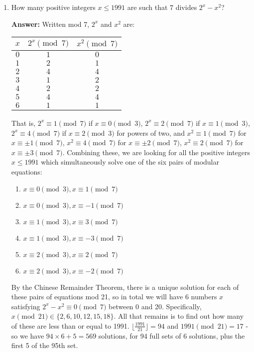 \documentclass{article}
\begin{document}
\begin{enumerate}
    \item How many positive integers $x \leq 1991$ are such that $7$ divides $2^x - x^2$?
    
    \textbf{Answer:} Written mod 7, $2^x$ and $x^2$ are:
    \begin{center}
    \begin{tabular}{ |c|c|c| } 
    \hline
    $x$ & $2^x \pmod{7}$ & $x^2 \pmod{7}$ \\
    \hline
    $0$ & $1$ & $0$ \\
    $1$ & $2$ & $1$ \\
    $2$ & $4$ & $4$ \\
    $3$ & $1$ & $2$ \\
    $4$ & $2$ & $2$ \\
    $5$ & $4$ & $4$ \\
    $6$ & $1$ & $1$ \\
    \hline
    \end{tabular}
    \end{center}

    That is, $2^x \equiv 1 \pmod{7}$ if $x \equiv 0 \pmod{3}$, $2^x \equiv 2 \pmod{7}$ if $x \equiv 1 \pmod{3}$, $2^x \equiv 4 \pmod{7}$ if $x \equiv 2 \pmod{3}$ for powers of two, and $x^2 \equiv 1 \pmod{7}$ for $x \equiv \pm1 \pmod{7}$, $x^2 \equiv 4 \pmod{7}$ for $x \equiv \pm 2 \pmod{7}$, $x^2 \equiv 2 \pmod{7}$ for $x \equiv \pm 3 \pmod{7}$. Combining these, we are looking for all the positive integers $x \leq 1991$ which simultaneously solve one of the six pairs of modular equations:
    \begin{enumerate}
        \item $x \equiv 0 \pmod{3}, x \equiv 1 \pmod{7}$
        \item $x \equiv 0 \pmod{3}, x \equiv -1 \pmod{7}$
        \item $x \equiv 1 \pmod{3}, x \equiv  3 \pmod{7}$
        \item $x \equiv 1 \pmod{3}, x \equiv -3 \pmod{7}$
        \item $x \equiv 2 \pmod{3}, x \equiv 2 \pmod{7}$
        \item $x \equiv 2 \pmod{3}, x \equiv -2 \pmod{7}$
    \end{enumerate}
    
    By the Chinese Remainder Theorem, there is a unique solution for each of these pairs of equations mod 21, so in total we will have 6 numbers $x$ satisfying $2^x-x^2 \equiv 0 \pmod{7}$ between 0 and 20. Specifically, $x \pmod{21} \in \{2, 6, 10, 12, 15, 18\}$. All that remains is to find out how many of these are less than or equal to 1991. $\lfloor \frac{1991}{21} \rfloor = 94$ and $1991 \pmod{21} = 17$ - so we have $94 \times 6 + 5 = 569$ solutions, for 94 full sets of 6 solutions, plus the first 5 of the 95th set.
    

\end{enumerate}
\end{document}
